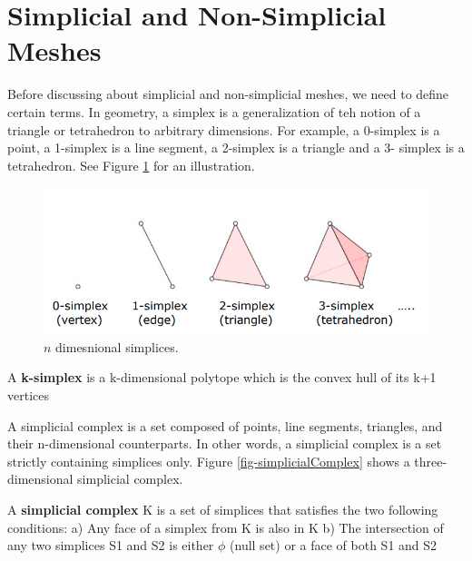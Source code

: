 \section{Simplicial and Non-Simplicial Meshes}
\label{sec-simplicial}

Before discussing about simplicial and non-simplicial meshes, we need to define certain terms. In geometry, a simplex is a generalization of teh notion of a triangle or tetrahedron to arbitrary dimensions. For example, a 0-simplex is a point, a 1-simplex is a line segment, a 2-simplex is a triangle and a 3- simplex is a tetrahedron. See Figure \ref{fig-simplices} for an illustration.

\begin{figure}
	\centering
	\includegraphics[width=0.95\linewidth]{img/intro/simplices.png}
	\caption{$n$ dimesnional simplices.}
	\label{fig-simplices}
\end{figure}

\begin{definition}
A \textbf{k-simplex} is a k-dimensional polytope which is the convex hull of its k+1 vertices
\end{definition}

A simplicial complex is a set composed of points, line segments, triangles, and their n-dimensional counterparts. In other words, a simplicial complex is a set strictly containing simplices only. Figure \ref{fig-simplicialComplex} shows a three-dimensional simplicial complex.

\begin{definition}
A \textbf{simplicial complex} K
is a set of simplices that
satisfies the two following
conditions:
a) Any face of a simplex
 from K is also in K
b) The intersection of any
 two simplices S1 and S2
 is either $\phi$ (null set) or a face of
 both S1 and S2
\end{definition}

